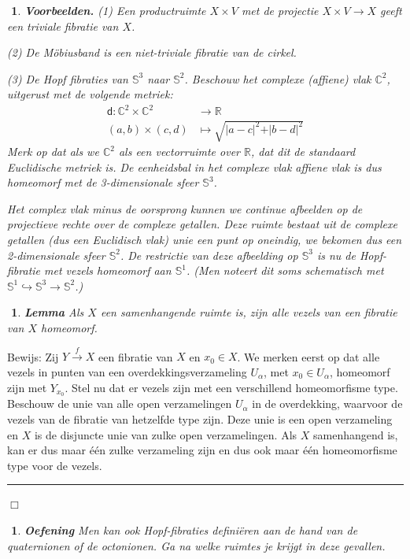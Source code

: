 \documentclass[12pt]{book}
\newcommand{\R}{\mathbb{R}}
\newcommand{\Sf}{\mathbb{S}}
\newcommand{\dd}{\mathsf{d}}
\newcommand{\bew}{{\sc Bewijs: }}
\newcommand{\B}{\rule{1mm}{0mm} \hfill $\Box$ }
\newtheorem{eigh}[stelh]{$\!\!$}
\newenvironment{eig}{\begin{eigh}{\em {\bf Lemma }}}{\end{eigh}}
\newtheorem{vbnh}[stelh]{$\!\!$}
\newenvironment{vbn}{\begin{vbnh} \em {\bf Voorbeelden.}}{\end{vbnh}}
\newtheorem{eoef}{$\!\!$}[chapter]
\newenvironment{oef}{\begin{eoef} {\bf Oefening}}{\end{eoef}}
\begin{document}
\begin{vbn} (1) Een productruimte $X\times V$ met de projectie $X\times V \to X$ geeft een {\em triviale fibratie} van $X$. 

(2) De M\"obiusband is een niet-triviale fibratie van de cirkel.

(3) De Hopf fibraties van $\mathbb{S}^3$ naar $\mathbb{S}^2$. Beschouw het complexe (affiene) vlak $\mathbb{C}^2$, uitgerust met de volgende metriek:
\begin{align*}
\dd : \mathbb{C}^2 \times \mathbb{C}^2 &\to \R \\
(a,b) \times (c,d)  &\mapsto \sqrt{\vert a - c \vert^2 + \vert b- d \vert^2}
\end{align*}
Merk op dat als we $\mathbb{C}^2$ als een vectorruimte over $\R$, dat dit de standaard Euclidische metriek is. De eenheidsbal in het complexe vlak affiene vlak is dus homeomorf met de 3-dimensionale sfeer $\mathbb{S}^3$.

Het complex vlak minus de oorsprong kunnen we continue afbeelden op de projectieve rechte over de complexe getallen. Deze ruimte bestaat uit de complexe getallen (dus een Euclidisch vlak) unie een punt op oneindig, we bekomen dus een 2-dimensionale sfeer $\mathbb{S}^2$. De restrictie van deze afbeelding op $\mathbb{S}^3$ is nu de \emph{Hopf-fibratie} met vezels homeomorf aan $\mathbb{S}^1$. (Men noteert dit soms schematisch met $\Sf^1 \hookrightarrow \Sf^3 \to \Sf^2$.)
\end{vbn}

\begin{eig} Als $X$ een samenhangende ruimte is,  zijn alle vezels van een fibratie van $X$ homeomorf.
\end{eig}
\bew Zij $Y\stackrel{f}{\to} X$ een fibratie van $X$ en $x_0\in X$. We merken eerst op dat alle vezels in punten van een overdekkingsverzameling $U_\alpha$, met $x_0\in U_\alpha$, homeomorf zijn met $Y_{x_{0}}$. Stel nu dat er vezels zijn met een verschillend homeomorfisme type. Beschouw de unie van alle open verzamelingen $U_\alpha$ in de overdekking, waarvoor de vezels van de fibratie van hetzelfde type zijn. Deze unie is een open verzameling en $X$ is de disjuncte unie van zulke open verzamelingen. Als $X$ samenhangend is, kan er dus maar \'e\'en zulke verzameling zijn en dus ook maar \'e\'en homeomorfisme type voor de vezels. \B


\begin{oef}
Men kan ook Hopf-fibraties defini\"eren aan de hand van de quaternionen of de octonionen. Ga na welke ruimtes je krijgt in deze gevallen.
\end{oef}
\end{document}
